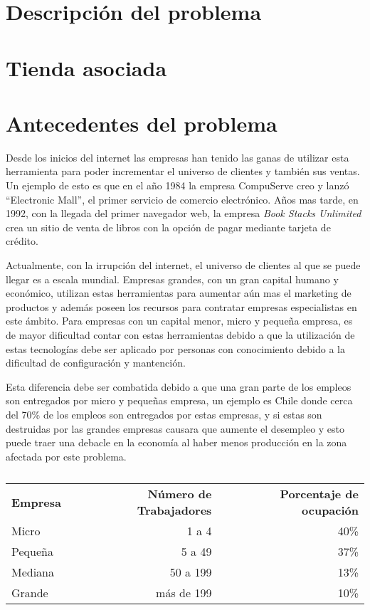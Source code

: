 \section{Descripción del problema}


\section{Tienda asociada}


\section{Antecedentes del problema}

Desde los inicios del internet las empresas han tenido las ganas de utilizar
esta herramienta para poder incrementar el universo de clientes y también sus
ventas.
Un ejemplo de esto es que en el año 1984 la empresa CompuServe creo y lanzó
``Electronic Mall'', el primer servicio de comercio electrónico\cite{Def:1}.
Años mas tarde, en 1992, con la llegada del primer navegador web, la empresa
\emph{Book Stacks Unlimited} crea un sitio de venta de libros con la opción de
pagar mediante tarjeta de crédito.

Actualmente, con la irrupción del internet, el universo de clientes al que se
puede llegar es a escala mundial.
Empresas grandes, con un gran capital humano y económico, utilizan estas
herramientas para aumentar aún mas el marketing de productos y además poseen los
recursos para contratar empresas especialistas en este ámbito.
Para empresas con un capital menor, micro y pequeña empresa, es de mayor
dificultad contar con estas herramientas debido a que la utilización de estas
tecnologías debe ser aplicado por personas con conocimiento debido a la dificultad
de configuración y mantención.

Esta diferencia debe ser combatida debido a que una gran parte de los empleos
son entregados por micro y pequeñas empresa, un ejemplo es Chile donde cerca del
70\% de los empleos son entregados por estas empresas, y si estas son destruidas
por las grandes empresas causara que aumente el desempleo y esto puede traer una
debacle en la economía al haber menos producción en la zona afectada por este
problema.

\begin{table}[h]
\centering
\begin{tabular}{lrr}
{\bf Empresa}  & {\bf Número de Trabajadores} & {\bf Porcentaje de ocupación} \\
Micro    & 1 a 4                & 40\% \\
Pequeña  & 5 a 49               & 37\% \\
Mediana  & 50 a 199             & 13\% \\
Grande   & más de 199           & 10\% \\
\end{tabular}
\caption[lala]{}
\end{table}

